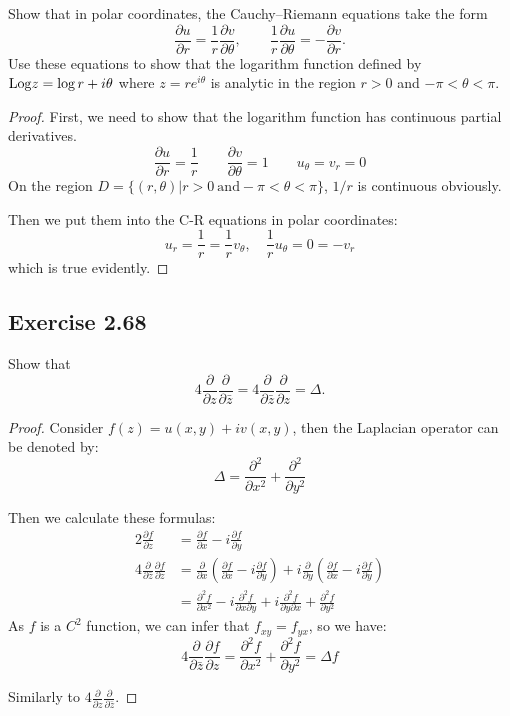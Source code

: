 \documentclass{article}
\begin{document}
Show that in polar coordinates, the Cauchy--Riemann equations take the form
\[
  \frac{\partial u}{\partial r} = \frac{1}{r}\frac{\partial v}{\partial \theta},
  \qquad
  \frac{1}{r}\frac{\partial u}{\partial \theta} = -\frac{\partial
  v}{\partial r}.
\]
Use these equations to show that the logarithm function defined by
$\mathrm{Log} z = \log r + i\theta$ where $z = re^{i\theta}$ is analytic in
the region $r > 0$ and $-\pi < \theta < \pi$.

\begin{proof}
  First, we need to show that the logarithm function has continuous
  partial derivatives.
  \[
    \frac{\partial u}{\partial r} = \frac{1}{r} \qquad
    \frac{\partial v}{\partial \theta} = 1 \qquad
    u_\theta = v_r = 0
  \]
  On the region $D = \{(r, \theta) | r > 0 \ \text{and} -\pi < \theta <
  \pi\}$, $1/r$ is continuous obviously.

  Then we put them into the C-R equations in polar coordinates:
  \[
    u_r = \frac{1}{r} = \frac{1}{r} v_\theta,\quad \frac{1}{r}
    u_\theta = 0 = -v_r
  \]
  which is true evidently.

\end{proof}

\subsection{Exercise 2.68}

Show that
\[
  4 \frac{\partial}{\partial z} \frac{\partial}{\partial \bar{z}} = 4
  \frac{\partial}{\partial \bar{z}} \frac{\partial}{\partial z} = \Delta.
\]

\begin{proof}
  Consider $f(z) = u(x,y) + iv(x,y)$, then the Laplacian operator can be denoted
  by:
  \[
    \Delta = \frac{\partial^2}{\partial x^2} + \frac{\partial^2}{\partial y^2}
  \]

  Then we calculate these formulas:
  \[
    \begin{aligned}
      2\frac{\partial f}{\partial z} &= \frac{\partial f}{\partial x}
      - i \frac{\partial f}{\partial y} \\
      4\frac{\partial }{\partial \bar{z}}\frac{\partial f}{\partial
      z} &= \frac{\partial}{\partial x}(\frac{\partial f}{\partial x}
      - i \frac{\partial f}{\partial y} ) + i
      \frac{\partial}{\partial y}(\frac{\partial f}{\partial x}
      - i \frac{\partial f}{\partial y} ) \\
      &= \frac{\partial^2 f}{\partial x^2} - i \frac{\partial^2
      f}{\partial x \partial y} + i\frac{\partial^2 f}{\partial
      y \partial x} + \frac{\partial^2 f}{\partial y^2}
    \end{aligned}
  \]
  As $f$ is a $C^2$ function, we can infer that $f_{xy} = f_{yx}$, so we have:
  \[
    4\frac{\partial }{\partial \bar{z}}\frac{\partial f}{\partial z}
    = \frac{\partial^2 f}{\partial x^2}+ \frac{\partial^2 f}{\partial
    y^2} = \Delta f
  \]

  Similarly to $4\frac{\partial}{\partial z} \frac{\partial}{\partial \bar{z}}$.
\end{proof}
\end{document}
